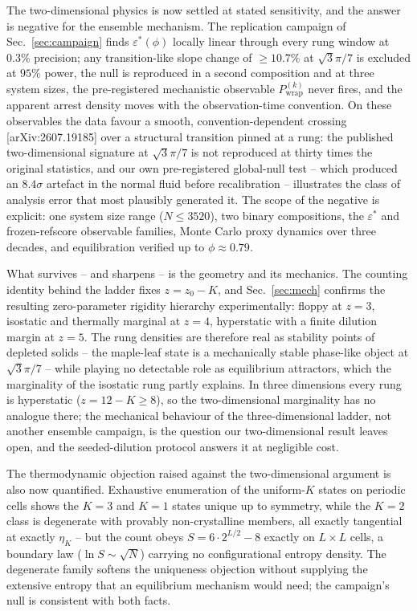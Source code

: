 \documentclass[11pt]{article}
\begin{document}
The two-dimensional physics is now settled at stated sensitivity, and the
answer is negative for the ensemble mechanism. The replication campaign of
Sec.~\ref{sec:campaign} finds $\varepsilon^*(\phi)$ locally linear through
every rung window at $0.3\%$ precision; any transition-like slope change of
$\geq10.7\%$ at $\sqrt{3}\pi/7$ is excluded at $95\%$ power, the null is
reproduced in a second composition and at three system sizes, the
pre-registered mechanistic observable $P^{(k)}_{\mathrm{wrap}}$ never fires,
and the apparent arrest density moves with the observation-time convention.
On these observables the data favour a smooth, convention-dependent crossing
[arXiv:2607.19185] over a structural transition pinned at a rung: the
published two-dimensional signature at $\sqrt{3}\pi/7$ is not reproduced at
thirty times the original statistics, and our own pre-registered global-null
test -- which produced an $8.4\sigma$ artefact in the normal fluid before
recalibration -- illustrates the class of analysis error that most plausibly
generated it. The scope of the negative is explicit: one system size range
($N\leq3520$), two binary compositions, the $\varepsilon^*$ and
frozen-refscore observable families, Monte Carlo proxy dynamics over three
decades, and equilibration verified up to $\phi\approx0.79$.

What survives -- and sharpens -- is the geometry and its mechanics. The
counting identity behind the ladder fixes $z=z_0-K$, and
Sec.~\ref{sec:mech} confirms the resulting zero-parameter rigidity
hierarchy experimentally: floppy at $z=3$, isostatic and thermally marginal
at $z=4$, hyperstatic with a finite dilution margin at $z=5$. The rung
densities are therefore real as stability points of depleted solids -- the
maple-leaf state is a mechanically stable phase-like object at
$\sqrt{3}\pi/7$ -- while playing no detectable role as equilibrium
attractors, which the marginality of the isostatic rung partly explains. In
three dimensions every rung is hyperstatic ($z=12-K\geq8$), so the
two-dimensional marginality has no analogue there; the mechanical behaviour
of the three-dimensional ladder, not another ensemble campaign, is the
question our two-dimensional result leaves open, and the seeded-dilution
protocol answers it at negligible cost.

The thermodynamic objection raised against the two-dimensional argument is
also now quantified. Exhaustive enumeration of the uniform-$K$ states on
periodic cells shows the $K{=}3$ and $K{=}1$ states unique up to symmetry,
while the $K{=}2$ class is degenerate with provably non-crystalline members,
all exactly tangential at exactly $\eta_K$ -- but the count obeys
$S=6\cdot2^{L/2}-8$ exactly on $L\times L$ cells, a boundary law
($\ln S\sim\sqrt{N}$) carrying no configurational entropy density. The
degenerate family softens the uniqueness objection without supplying the
extensive entropy that an equilibrium mechanism would need; the campaign's
null is consistent with both facts.
\end{document}
